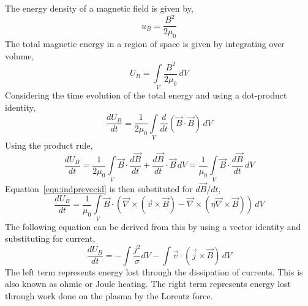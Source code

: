 The energy density of a magnetic field is given by,
\begin{equation}
u_B = \frac{B^2}{2\mu_0}
\end{equation}
The total magnetic energy in a region of space is given by integrating over volume,
\begin{equation}
U_B = \int \limits_V \frac{B^2}{2\mu_0}\,dV  
\end{equation}
Considering the time evolution of the total energy and using a dot-product identity, 
\begin{equation}
\frac{d U_B}{d t} = \frac{1}{2\mu_0} \int \limits_V \frac{d}{dt}(\vec{B}\cdot\vec{B})\,dV  
\end{equation}
Using the product rule,
\begin{equation}
\frac{d U_B}{d t} = \frac{1}{2\mu_0} \int \limits_V \vec{B}\cdot\frac{d\vec{B}}{dt}+\frac{d\vec{B}}{dt}\cdot\vec{B}\,dV = \frac{1}{\mu_0} \int \limits_V \vec{B}\cdot\frac{d\vec{B}}{dt}\,dV 
\end{equation}
Equation~\ref{eqn:indprevecid} is then substituted for $d\vec{B}/dt$,
\begin{equation}
\frac{d U_B}{d t} = \frac{1}{\mu_0} \int \limits_V \vec{B} \cdot (\vec{\nabla} \times (\vec{v} \times \vec{B}) - \vec{\nabla} \times (\eta \vec{\nabla} \times \vec{B}))\,dV  
\end{equation}
The following equation can be derived from this by using a vector identity and substituting for current,
\begin{equation}
\frac{d U_B}{d t} = -\int \frac{j^2}{\sigma} dV - \int \vec{v} \cdot (\vec{j} \times \vec{B})\,dV  
\end{equation}
The left term represents energy lost through the dissipation of currents. This is also known as ohmic or Joule heating. The right term represents energy lost through work done on the plasma by the Lorentz force.

